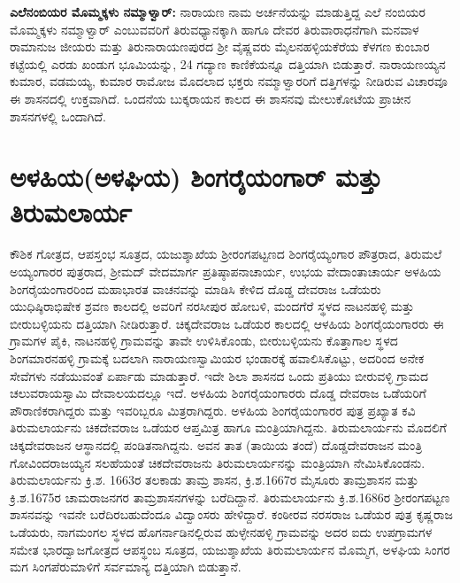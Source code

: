 \textbf{ಎಲೆನಂಬಿಯರ ಮೊಮ್ಮಕ್ಕಳು ನಮ್ಮಾಳ್ವಾರ್​:} ನಾರಾಯಣ ನಾಮ ಅರ್ಚನೆಯನ್ನು ಮಾಡುತ್ತಿದ್ದ ಎಲೆ ನಂಬಿಯರ ಮೊಮ್ಮಕ್ಕಳು ನಮ್ಮಾಳ್ವಾರ್​ ಎಂಬುವವರಿಗೆ ತಿರುವಧ್ಯಾನಕ್ಕಾಗಿ ಹಾಗೂ ದೇವರ ತಿರುವಾರಾಧನೆಗಾಗಿ ಮನವಾಳ ರಾಮಾನುಜ ಜೀಯರು ಮತ್ತು ತಿರುನಾರಾಯಣಪುರದ ಶ‍್ರೀ ವೈಷ್ಣವರು ಮೈಲನಹಳ್ಳಿಯಕೆರೆಯ ಕೆಳಗಣ ಕುಂಬಾರ ಕಟ್ಟೆಯಲ್ಲಿ ಎರಡು ಖಂಡುಗ ಭೂಮಿಯನ್ನು, 24 ಗದ್ಯಾಣ ಕಾಣಿಕೆಯನ್ನೂ ದತ್ತಿಯಾಗಿ ಬಿಡುತ್ತಾರೆ. ನಾರಾಯಣಯ್ಯನ ಕುಮಾರ, ವಡಮಯ್ಯ, ಕುಮಾರ ರಾಮೋಜ ಮೊದಲಾದ ಭಕ್ತರು ನಮ್ಮಾಳ್ವಾರರಿಗೆ ದತ್ತಿಗಳನ್ನು ನೀಡಿರುವ ವಿಚಾರವೂ ಈ ಶಾಸನದಲ್ಲಿ ಉಕ್ತವಾಗಿದೆ. ಒಂದನೆಯ ಬುಕ್ಕರಾಯನ ಕಾಲದ ಈ ಶಾಸನವು ಮೇಲುಕೋಟೆಯ ಪ್ರಾಚೀನ ಶಾಸನಗಳಲ್ಲಿ ಒಂದಾಗಿದೆ.


\section{ಅಳಹಿಯ(ಅಳಘಿಯ) ಶಿಂಗರೈಯಂಗಾರ್​ ಮತ್ತು ತಿರುಮಲಾರ್ಯ}

ಕೌಶಿಕ ಗೋತ್ರದ, ಆಪಸ್ತಂಭ ಸೂತ್ರದ, ಯಜುಶ್ಶಾಖೆಯ ಶ‍್ರೀರಂಗಪಟ್ಟಣದ ಶಿಂಗರೈಯ್ಯಂಗಾರ ಪೌತ್ರರಾದ, ತಿರುಮಲೆ ಅಯ್ಯಂಗಾರರ ಪುತ್ರರಾದ, ಶ‍್ರೀಮದ್​ ವೇದಮಾರ್ಗ ಪ್ರತಿಷ್ಠಾಪನಾಚಾರ್ಯ, ಉಭಯ ವೇದಾಂತಾಚಾರ್ಯ ಅಳಹಿಯ ಶಿಂಗರೈಯಂಗಾರರಿಂದ ಮಹಾಭಾರತ ವಾಚನವನ್ನು ಮಾಡಿಸಿ ಕೇಳಿದ ದೊಡ್ಡ ದೇವರಾಜ ಒಡೆಯರು ಯುಧಿಷ್ಠಿರಾಭಿಷೇಕ ಶ್ರವಣ ಕಾಲದಲ್ಲಿ ಅವರಿಗೆ ನರಸೀಪುರ ಹೋಬಳಿ, ಮಂದಗೆರೆ ಸ್ಥಳದ ನಾಟನಹಳ್ಳಿ ಮತ್ತು ಬೀರುಬಳ್ಳಿಯನು ದತ್ತಿಯಾಗಿ ನೀಡಿರುತ್ತಾರೆ. ಚಿಕ್ಕದೇವರಾಜ ಒಡೆಯರ ಕಾಲದಲ್ಲಿ ಆಳಹಿಯ ಶಿಂಗರೈಯಂಗಾರರು ಈ ಗ್ರಾಮಗಳ ಪೈಕಿ, ನಾಟನಹಳ್ಳಿ ಗ್ರಾಮವನ್ನು ತಾವೇ ಉಳಿಸಿಕೊಂಡು, ಬೀರುಬಳ್ಳಿಯನು ಕೊತ್ತಾಗಾಲ ಸ್ಥಳದ ಶಿಂಗಮಾರನಹಳ್ಳಿ ಗ್ರಾಮಕ್ಕೆ ಬದಲಾಗಿ ನಾರಾಯಣಸ್ವಾಮಿಯರ ಭಂಡಾರಕ್ಕೆ ಹವಾಲಿಸಿಕೊಟ್ಟು, ಅದರಿಂದ ಅನೇಕ ಸೇವೆಗಳು ನಡೆಯುವಂತೆ ಏರ್ಪಾಡು ಮಾಡುತ್ತಾರೆ. ಇದೇ ಶಿಲಾ ಶಾಸನದ ಒಂದು ಪ್ರತಿಯು ಬೀರುವಳ್ಳಿ ಗ್ರಾಮದ ಚಲುವರಾಯಸ್ವಾಮಿ ದೇವಾಲಯದಲ್ಲೂ ಇದೆ. ಅಳಹಿಯ ಶಿಂಗರೈಯಂಗಾರರು ದೊಡ್ಡ ದೇವರಾಜ ಒಡೆಯರಿಗೆ ಪೌರಾಣಿಕರಾಗಿದ್ದರು ಮತ್ತು ಇವರಿಬ್ಬರೂ ಮಿತ್ರರಾಗಿದ್ದರು. ಅಳಹಿಯ ಶಿಂಗರೈಯಂಗಾರರ ಪುತ್ರ ಪ್ರಖ್ಯಾತ ಕವಿ ತಿರುಮಲಾರ್ಯನು ಚಿಕದೇವರಾಜ ಒಡೆಯರ ಆಪ್ತಮಿತ್ರ ಹಾಗೂ ಮಂತ್ರಿಯಾಗಿದ್ದನು. ತಿರುಮಲಾರ್ಯನು ಮೊದಲಿಗೆ ಚಿಕ್ಕದೇವರಾಜನ ಆಸ್ಥಾನದಲ್ಲಿ ಪಂಡಿತನಾಗಿದ್ದನು. ಅವನ ತಾತ (ತಾಯಿಯ ತಂದೆ) ದೊಡ್ಡದೇವರಾಜನ ಮಂತ್ರಿ ಗೋವಿಂದರಾಜಯ್ಯನ ಸಲಹೆಯಂತೆ ಚಿಕದೇವರಾಜನು ತಿರುಮಲಾರ್ಯನನ್ನು ಮಂತ್ರಿಯಾಗಿ ನೇಮಿಸಿಕೊಂಡನು. ತಿರುಮಲಾರ್ಯನು ಕ್ರಿ.ಶ. 1663ರ ತಲಕಾಡು ತಾಮ್ರ ಶಾಸನ, ಕ್ರಿ.ಶ.1667ರ ಮೈಸೂರು ತಾಮ್ರಶಾಸನ ಮತ್ತು ಕ್ರಿ.ಶ.1675ರ ಚಾಮರಾಜನಗರ ತಾಮ್ರಶಾಸನಗಳನ್ನು ಬರೆದಿದ್ದಾನೆ. ತಿರುಮಲಾರ್ಯನು ಕ್ರಿ.ಶ.1686ರ ಶ‍್ರೀರಂಗಪಟ್ಟಣ ಶಾಸನವನ್ನು ಇವನೇ ಬರೆದಿರಬಹುದೆಂದೂ ವಿದ್ವಾಂಸರು ಹೇಳಿದ್ದಾರೆ. ಕಂಠೀರವ ನರಸರಾಜ ಒಡೆಯರ ಪುತ್ರ ಕೃಷ್ಣರಾಜ ಒಡೆಯರು, ನಾಗಮಂಗಲ ಸ್ಥಳದ ಹೊಗರ್ನಾಡಿನಲ್ಲಿರುವ ಹುಳ್ಳೇನಹಳ್ಳಿ ಗ್ರಾಮವನ್ನು ಅದರ ಐದು ಉಪಗ್ರಾಮಗಳ ಸಮೇತ ಭಾರದ್ವಾಜಗೋತ್ರದ ಆಪಸ್ಥಂಬ ಸೂತ್ರದ, ಯಜುಶ್ಶಾಖೆಯ ತಿರುಮಲಾರ್ಯನ ಮೊಮ್ಮಗ, ಅಳಘಿಯ ಸಿಂಗರ ಮಗ ಸಿಂಗಪೆರುಮಾಳಿಗೆ ಸರ್ವಮಾನ್ಯ ದತ್ತಿಯಾಗಿ ಬಿಡುತ್ತಾನೆ.

